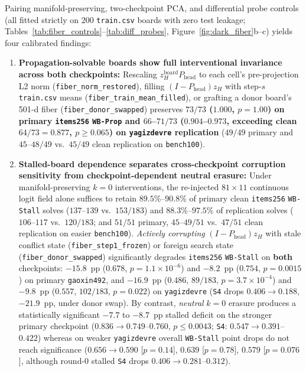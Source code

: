 \documentclass[10pt,letterpaper]{article}
\newcommand{\Phead}{P_{\mathrm{head}}}
\begin{document}
Pairing manifold-preserving, two-checkpoint PCA, and differential probe controls (all fitted strictly on $200$ \texttt{train.csv} boards with zero test leakage; Tables~\ref{tab:fiber_controls}--\ref{tab:diff_probes}, Figure~\ref{fig:dark_fiber}b--c) yields four calibrated findings:
\begin{enumerate}[topsep=3pt,itemsep=2pt]
  \item \textbf{Propagation-solvable boards show full interventional invariance across both checkpoints:} Rescaling $z_H^{\mathrm{board}}\Phead$ to each cell's pre-projection L2 norm (\texttt{fiber\_norm\_restored}), filling $(I-\Phead)z_H$ with step-$s$ \texttt{train.csv} means (\texttt{fiber\_train\_mean\_filled}), or grafting a donor board's 501-d fiber (\texttt{fiber\_donor\_swapped}) preserves \textbf{$73/73$ ($1.000$, $p=1.00$) on primary \texttt{items256} \texttt{WB-Prop} and $66$--$71/73$ ($0.904$--$0.973$, exceeding clean $64/73 = 0.877$, $p \ge 0.065$) on \texttt{yagizdevre} replication} ($49/49$ primary and $45$--$48/49$ vs.\ $45/49$ clean replication on \texttt{bench100}).
  \item \textbf{Stalled-board dependence separates cross-checkpoint corruption sensitivity from checkpoint-dependent neutral erasure:} Under manifold-preserving $k=0$ interventions, the re-injected $81\times 11$ continuous logit field alone suffices to retain $89.5\%$--$90.8\%$ of primary clean \texttt{items256} \texttt{WB-Stall} solves ($137$--$139$ vs.\ $153/183$) and $88.3\%$--$97.5\%$ of replication solves ($106$--$117$ vs.\ $120/183$; and $51/51$ primary, $45$--$49/51$ vs.\ $47/51$ clean replication on easier \texttt{bench100}). \emph{Actively corrupting} $(I-\Phead)z_H$ with stale conflict state (\texttt{fiber\_step1\_frozen}) or foreign search state (\texttt{fiber\_donor\_swapped}) significantly degrades \texttt{items256} \texttt{WB-Stall} on \textbf{both} checkpoints: $-15.8$~pp ($0.678$, $p=1.1\times 10^{-6}$) and $-8.2$~pp ($0.754$, $p=0.0015$) on primary \texttt{gaoxin492}, and $-16.9$~pp ($0.486$, $89/183$, $p=3.7\times 10^{-4}$) and $-9.8$~pp ($0.557$, $102/183$, $p=0.022$) on \texttt{yagizdevre} (\texttt{S4} drops $0.406 \to 0.188$, $-21.9$~pp, under donor swap). By contrast, \emph{neutral} $k=0$ erasure produces a statistically significant $-7.7$ to $-8.7$~pp stalled deficit on the stronger primary checkpoint ($0.836 \to 0.749$--$0.760$, $p \le 0.0043$; \texttt{S4}: $0.547 \to 0.391$--$0.422$) whereas on weaker \texttt{yagizdevre} overall \texttt{WB-Stall} point drops do not reach significance ($0.656 \to 0.590$ [$p=0.14$], $0.639$ [$p=0.78$], $0.579$ [$p=0.076$], although round-0 stalled \texttt{S4} drops $0.406 \to 0.281$--$0.312$).

\end{enumerate}
\end{document}

